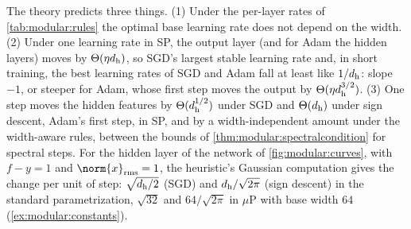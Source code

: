 \begin{refsection}
The theory predicts three things. (1) Under the per-layer rates of \cref{tab:modular:rules} the optimal base learning rate does not depend on the width. (2) Under one learning rate in SP, the output layer (and for Adam the hidden layers) moves by $\Theta(\eta d_{\mathrm h})$, so SGD's largest stable learning rate and, in short training, the best learning rates of SGD and Adam fall at least like $1/d_{\mathrm h}$: slope $-1$, or steeper for Adam, whose first step moves the output by $\Theta(\eta d_{\mathrm h}^{3/2})$. (3) One step moves the hidden features by $\Theta(d_{\mathrm h}^{1/2})$ under SGD and $\Theta(d_{\mathrm h})$ under sign descent, Adam's first step, in SP, and by a width-independent amount under the width-aware rules, between the bounds of \cref{thm:modular:spectralcondition} for spectral steps. For the hidden layer of the network of \cref{fig:modular:curves}, with $f-y=1$ and $\norm{x}_\rms=1$, the heuristic's Gaussian computation gives the change per unit of step: $\sqrt{d_{\mathrm h}/2}$ (SGD) and $d_{\mathrm h}/\sqrt{2\pi}$ (sign descent) in the standard parametrization, $\sqrt{32}$ and $64/\sqrt{2\pi}$ in $\mu$P with base width $64$ (\cref{ex:modular:constants}).


\end{refsection}
